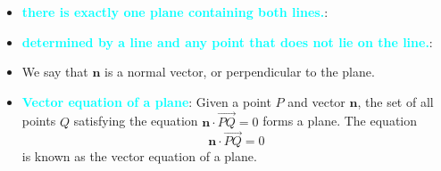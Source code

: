 \documentclass{report}
\begin{document}
\begin{itemize}
        \item \textbf{\textcolor{cyan}{there is exactly one plane containing both lines.}}:
        \item \textbf{\textcolor{cyan}{determined by a line and any point that does not lie on the line.}}:
        \item We say that  $\mathbf{n}$ is a normal vector, or perpendicular to the plane.
        \item \textbf{\textcolor{cyan}{Vector equation of a plane}}:
            Given a point $P$ and vector $\mathbf{n}$, the set of all points $Q$ satisfying the equation $\mathbf{n} \cdot \overrightarrow{PQ} = 0$ forms a plane. The equation
            \[
                \mathbf{n} \cdot \overrightarrow{PQ} = 0
            \]
            is known as the vector equation of a plane.


\end{itemize}
\end{document}
